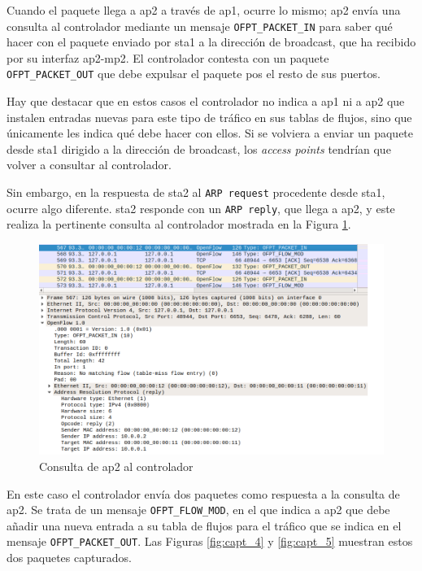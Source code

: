 \documentclass[a4paper,12pt,twoside,spanish]{book}
\begin{document}
Cuando el paquete llega a ap2 a través de ap1, ocurre lo mismo; ap2 envía una consulta al controlador mediante un mensaje \texttt{OFPT\_PACKET\_IN} para saber qué hacer con el paquete enviado por sta1 a la dirección de broadcast, que ha recibido por su interfaz ap2-mp2. El controlador contesta con un paquete \texttt{OFPT\_PACKET\_OUT} que debe expulsar el paquete pos el resto de sus puertos.\par 

Hay que destacar que en estos casos el controlador no indica a ap1 ni a ap2 que instalen entradas nuevas para este tipo de tráfico en sus tablas de flujos, sino que únicamente les indica qué debe hacer con ellos. Si se volviera a enviar un paquete desde sta1 dirigido a la dirección de broadcast, los \textit{access points} tendrían que volver a consultar al controlador.\par 

Sin embargo, en la respuesta de sta2 al \texttt{ARP request} procedente desde sta1, ocurre algo diferente. sta2 responde con un \texttt{ARP reply}, que llega a ap2, y este realiza la pertinente consulta al controlador mostrada en la Figura \ref{fig:capt_3}.\par 

	\begin{figure}[!h]
		\centering
		\includegraphics[scale=0.4]{Figuras/capt_3.png}
		\caption{Consulta de ap2 al controlador}
		\label{fig:capt_3}
	\end{figure}

En este caso el controlador envía dos paquetes como respuesta a la consulta de ap2. Se trata de un mensaje \texttt{OFPT\_FLOW\_MOD}, en el que indica a ap2 que debe añadir una nueva entrada a su tabla de flujos para el tráfico que se indica en el mensaje \texttt{OFPT\_PACKET\_OUT}. Las Figuras \ref{fig:capt_4} y \ref{fig:capt_5} muestran estos dos paquetes capturados. \par
\end{document}
